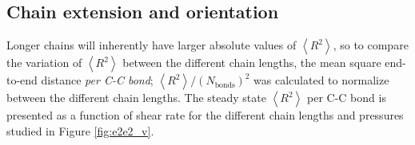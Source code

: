 \documentclass[5p]{elsarticle}
\begin{document}
\subsection{Chain extension and orientation}
\label{ext}

Longer chains will inherently have larger absolute values of $\left< R^2 \right> $, so to compare the variation of $\left< R^2 \right> $ between the different chain lengths, the mean square end-to-end distance \emph{per C-C bond}; $\left< R^2 \right>/\left(N_\text{bonds}\right)^2$ was calculated to normalize between the different chain lengths. The steady state $\left< R^2 \right> $ per C-C bond is presented as a function of shear rate for the different chain lengths and pressures studied in Figure \ref{fig:e2e2_v}.

\end{document}
